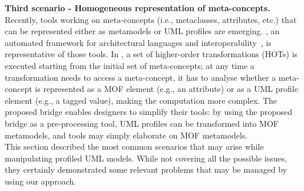 \textbf{Third scenario - Homogeneous representation of meta-concepts.}
Recently, tools working on meta-concepts (i.e., metaclasses, attributes, etc.) that can be represented either
as metamodels or UML profiles are emerging. \dually{}, an automated framework for architectural languages and interoperability~\cite{duallyTSE}, is representative of those tools. In \dually{}, a set of higher-order transformations (HOTs) is executed starting from the initial set of meta-concepts; at any time a transformation needs to access a meta-concept, it has to analyse whether a meta-concept is represented as a MOF element (e.g., an attribute) or as a UML profile element (e.g., a tagged value), making the computation more complex.%
The proposed bridge enables designers to simplify their tools: by using the proposed bridge as a pre-processing tool, UML profiles can be transformed into MOF metamodels, and tools may simply elaborate on MOF metamodels.\\
 

This section described the most common scenarios that may arise while manipulating profiled UML models. While not covering all the possible issues, they certainly demonstrated some relevant problems that may be managed by using our approach. 